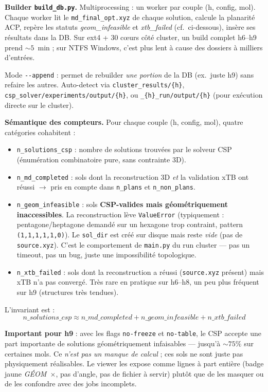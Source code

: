 \textbf{Builder \texttt{build\_db.py}.} Multiprocessing : un worker par couple
(h, config, mol). Chaque worker lit le \texttt{md\_final\_opt.xyz} de chaque solution,
calcule la planarité ACP, repère les statuts \emph{geom\_infeasible} et
\emph{xtb\_failed} (cf.~ci-dessous), insère ses résultats dans la DB. Sur
ext4 + 30 c\oe{}urs côté cluster, un build complet h6--h9 prend ${\sim}5$~min ;
sur NTFS Windows, c'est plus lent à cause des dossiers à milliers d'entrées.

Mode \texttt{-{}-append} : permet de rebuilder \emph{une portion} de la DB
(ex.~juste h9) sans refaire les autres. Auto-detect via
\texttt{cluster\_results/\{h\}}, \texttt{csp\_solver/experiments/output/\{h\}}, ou
\texttt{\_\{h\}\_run/output/\{h\}} (pour exécution directe sur le cluster).

\textbf{Sémantique des compteurs.} Pour chaque couple (h, config, mol), quatre
catégories cohabitent :

\begin{itemize}
  \item \texttt{n\_solutions\_csp} : nombre de solutions trouvées par le solveur CSP
    (énumération combinatoire pure, sans contrainte 3D).
  \item \texttt{n\_md\_completed} : sols dont la reconstruction 3D \emph{et} la
    validation xTB ont réussi $\rightarrow$ pris en compte dans \texttt{n\_plans}
    et \texttt{n\_non\_plans}.
  \item \texttt{n\_geom\_infeasible} : sols \textbf{CSP-valides mais géométriquement
    inaccessibles}. La reconstruction lève \texttt{ValueError} (typiquement :
    pentagone/heptagone demandé sur un hexagone trop contraint, pattern
    \texttt{(1,1,1,1,1,0)}). Le \texttt{sol\_dir} est créé sur disque mais reste
    \emph{vide} (pas de \texttt{source.xyz}). C'est le comportement de
    \texttt{main.py} du run cluster --- pas un timeout, pas un bug, juste une
    impossibilité topologique.
  \item \texttt{n\_xtb\_failed} : sols dont la reconstruction a réussi
    (\texttt{source.xyz} présent) mais xTB n'a pas convergé. Très rare en
    pratique sur h6--h8, un peu plus fréquent sur h9 (structures très tendues).
\end{itemize}

L'invariant est :
\[
n\_solutions\_csp \approx n\_md\_completed + n\_geom\_infeasible + n\_xtb\_failed
\]

\textbf{Important pour h9} : avec les flags \texttt{no-freeze} et \texttt{no-table},
le CSP accepte une part importante de solutions géométriquement infaisables ---
jusqu'à ${\sim}75\%$ sur certaines mols. Ce \emph{n'est pas un manque de calcul} ;
ces sols ne sont juste pas physiquement réalisables. Le viewer les expose comme
lignes à part entière (badge jaune \emph{GÉOM~$\times$}, pas d'angle, pas de fichier
à servir) plutôt que de les masquer ou de les confondre avec des jobs incomplets.

